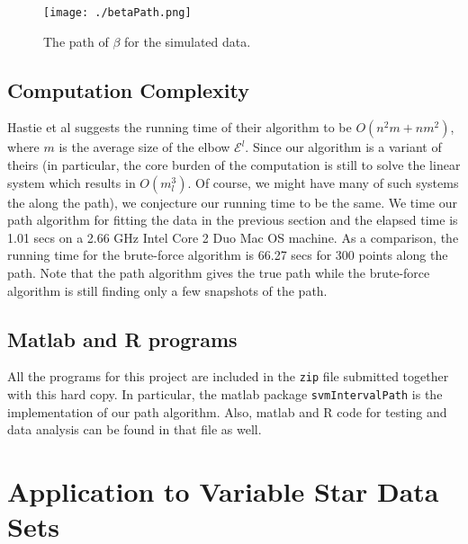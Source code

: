 \documentclass[10pt]{article}
\theoremstyle{definition}
\begin{document}
\begin{center}
\begin{figure}[!h]
   \centering
   \texttt{[image: ./betaPath.png]} 
      \caption{The path of $\beta$ for the simulated data.}
   \label{fig:betaPath}
\end{figure}
\end{center}


\subsection{Computation Complexity}
Hastie et al \cite{hastie2004entire} suggests the running time of their algorithm to be $O(n^2m+nm^2)$, where $m$ is the average size of the elbow $\mathcal E^l$. Since our algorithm is a variant of theirs (in particular, the core burden of the computation is still to solve the linear system which results in $O(m_l^3)$. Of course, we might have many of such systems the along the path), we conjecture our running time to be the same. We time our path algorithm for fitting the data in the previous section and the elapsed time is 1.01 secs on a 2.66 GHz Intel Core 2 Duo Mac OS machine. As a comparison, the running time for the brute-force algorithm is 66.27 secs for 300 points along the path. Note that the path algorithm gives the true path while the brute-force algorithm is still finding only a few snapshots of the path.  

\subsection{Matlab and R programs}
All the programs for this project are included in the {\tt zip} file submitted together with this hard copy. In particular, the matlab package {\tt svmIntervalPath} is the implementation of our path algorithm. Also, matlab and R code for testing and data analysis can be found in that file as well.


\section{Application to Variable Star Data Sets}
\end{document}
